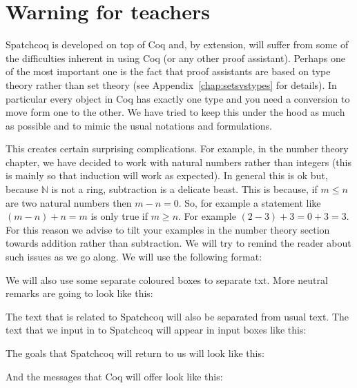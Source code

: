 \section{Warning for teachers}\label{subsec:warnings}

Spatchcoq is developed on top of Coq and, by extension, will suffer from some of the difficulties inherent in using Coq (or any other proof assistant). Perhaps one of the most important one is the fact that proof assistants are based on type theory rather than set theory (see Appendix~\ref{chap:setsvstypes} for details). In particular every object in Coq has exactly one type and you need a conversion to move form one to the other. We have tried to keep this under the hood as much as possible and to mimic the usual notations and formulations. 

This creates certain surprising complications. For example, in the number theory chapter, we have decided to work with natural numbers rather than integers (this is mainly so that induction will work as expected). In general this is ok but, because $\mathbb{N}$ is not a ring, subtraction is a delicate beast.  This is because, if $m\le n$ are two natural numbers then $m-n=0$. So, for example a statement like $ (m - n) + n = m$ is only true if $m\ge n$. For example $(2-3)+3=0+3=3$. For this reason we advise to tilt your examples in the number theory section towards addition rather than subtraction. We will try to remind the reader about such issues as we go along. We will use the following format:


We will also use some separate coloured boxes to separate txt. More neutral remarks are going to look like this:


The text that is related to Spatchcoq will also be separated from usual text. The text that we input in to Spatchcoq will appear in input boxes like this:

The goals that Spatchcoq will return to us will look like this:

And the messages that Coq will offer look like this:



 

